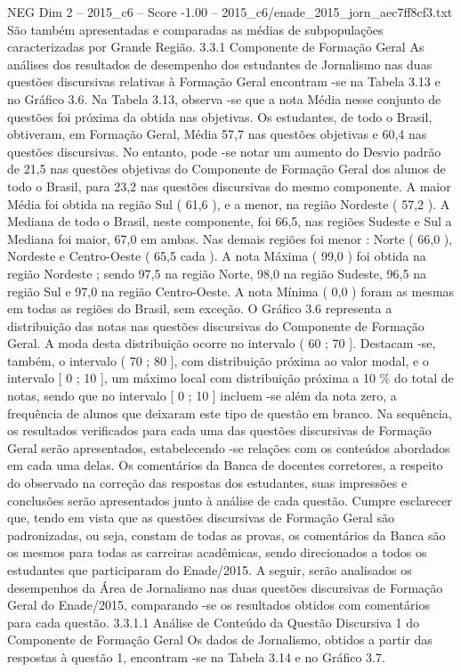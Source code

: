 \begin{textsample}{NEG Dim 2 – 2015\_c6 – Score -1.00 – 2015\_c6/enade\_2015\_jorn\_aec7ff8cf3.txt}
São também apresentadas e comparadas as médias de subpopulações caracterizadas por Grande Região. 3.3.1 Componente de Formação Geral As análises dos resultados de desempenho dos estudantes de Jornalismo nas duas questões discursivas relativas à Formação Geral encontram -se na Tabela 3.13 e no Gráfico 3.6.
Na Tabela 3.13, observa -se que a nota Média nesse conjunto de questões foi próxima da obtida nas objetivas.
Os estudantes, de todo o Brasil, obtiveram, em Formação Geral, Média 57,7 nas questões objetivas e 60,4 nas questões discursivas.
No entanto, pode -se notar um aumento do Desvio padrão de 21,5 nas questões objetivas do Componente de Formação Geral dos alunos de todo o Brasil, para 23,2 nas questões discursivas do mesmo componente.
A maior Média foi obtida na região Sul ( 61,6 ), e a menor, na região Nordeste ( 57,2 ).
A Mediana de todo o Brasil, neste componente, foi 66,5, nas regiões Sudeste e Sul a Mediana foi maior, 67,0 em ambas.
Nas demais regiões foi menor : Norte ( 66,0 ), Nordeste e Centro-Oeste ( 65,5 cada ).
A nota Máxima ( 99,0 ) foi obtida na região Nordeste ; sendo 97,5 na região Norte, 98,0 na região Sudeste, 96,5 na região Sul e 97,0 na região Centro-Oeste.
A nota Mínima ( 0,0 ) foram as mesmas em todas as regiões do Brasil, sem exceção.
O Gráfico 3.6 representa a distribuição das notas nas questões discursivas do Componente de Formação Geral.
A moda desta distribuição ocorre no intervalo ( 60 ; 70 ].
Destacam -se, também, o intervalo ( 70 ; 80 ], com distribuição próxima ao valor modal, e o intervalo [ 0 ; 10 ], um máximo local com distribuição próxima a 10 \% do total de notas, sendo que no intervalo [ 0 ; 10 ] incluem -se além da nota zero, a frequência de alunos que deixaram este tipo de questão em branco.
Na sequência, os resultados verificados para cada uma das questões discursivas de Formação Geral serão apresentados, estabelecendo -se relações com os conteúdos abordados em cada uma delas.
Os comentários da Banca de docentes corretores, a respeito do observado na correção das respostas dos estudantes, suas impressões e conclusões serão apresentados junto à análise de cada questão.
Cumpre esclarecer que, tendo em vista que as questões discursivas de Formação Geral são padronizadas, ou seja, constam de todas as provas, os comentários da Banca são os mesmos para todas as carreiras acadêmicas, sendo direcionados a todos os estudantes que participaram do Enade/2015.
A seguir, serão analisados os desempenhos da Área de Jornalismo nas duas questões discursivas de Formação Geral do Enade/2015, comparando -se os resultados obtidos com comentários para cada questão. 3.3.1.1 Análise de Conteúdo da Questão Discursiva 1 do Componente de Formação Geral Os dados de Jornalismo, obtidos a partir das respostas à questão 1, encontram -se na Tabela 3.14 e no Gráfico 3.7.

\end{textsample}
